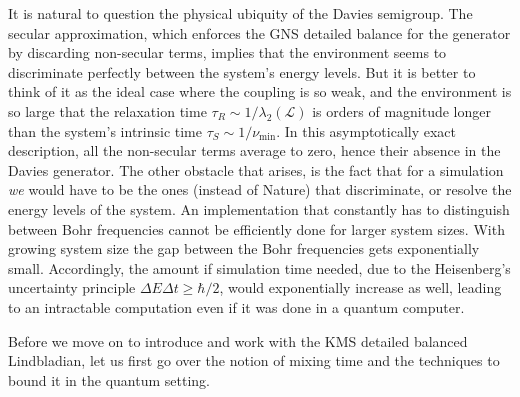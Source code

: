 It is natural to question the physical ubiquity of the Davies semigroup. The secular approximation, which enforces the GNS detailed balance for the generator by discarding non-secular terms, implies that the environment seems to discriminate perfectly between the system's energy levels. But it is better to think of it as the ideal case where the coupling is so weak, and the environment is so large that the relaxation time $\tau_R\sim 1 / \lambda_2(\mathcal{L})$ is orders of magnitude longer than the system's intrinsic time $\tau_S \sim 1/ \nu_{\min}$. In this asymptotically exact description, all the non-secular terms average to zero, hence their absence in the Davies generator. The other obstacle that arises, is the fact that for a simulation \textit{we} would have to be the ones (instead of Nature) that discriminate, or resolve the energy levels of the system. An implementation that constantly has to distinguish between Bohr frequencies cannot be efficiently done for larger system sizes. With growing system size the gap between the Bohr frequencies gets exponentially small. Accordingly, the amount if simulation time needed, due to the Heisenberg's uncertainty principle $\Delta E \Delta t \geq \hbar / 2$, would exponentially increase as well, leading to an intractable computation even if it was done in a quantum computer. 

Before we move on to introduce and work with the KMS detailed balanced Lindbladian, let us first go over the notion of mixing time and the techniques to bound it in the quantum setting. 

\smallskip
